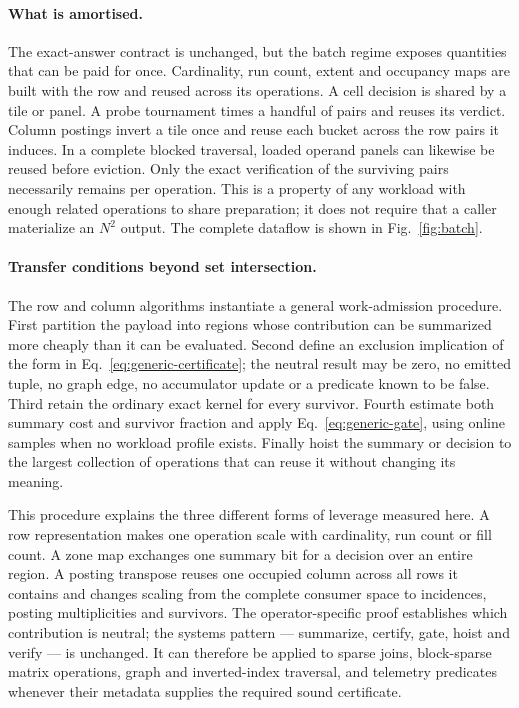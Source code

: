 \paragraph*{What is amortised.}
The exact-answer contract is unchanged, but the batch regime exposes quantities that can be paid for
once. Cardinality, run count, extent and occupancy maps are built with the row and reused across its
operations. A cell decision is shared by a tile or panel. A probe tournament times a handful of pairs
and reuses its verdict. Column postings invert a tile once and reuse each bucket across the row pairs
it induces. In a complete blocked traversal, loaded operand panels can likewise be reused before
eviction. Only the exact verification of the surviving pairs necessarily remains per operation. This
is a property of any workload with enough related operations to share preparation; it does not require
that a caller materialize an $N^2$ output. The complete dataflow is shown in Fig.~\ref{fig:batch}.

\paragraph*{Transfer conditions beyond set intersection.}
The row and column algorithms instantiate a general work-admission procedure. First partition the
payload into regions whose contribution can be summarized more cheaply than it can be evaluated.
Second define an exclusion implication of the form in Eq.~\eqref{eq:generic-certificate}; the neutral
result may be zero, no emitted tuple, no graph edge, no accumulator update or a predicate known to be
false. Third retain the ordinary exact kernel for every survivor. Fourth estimate both summary cost
and survivor fraction and apply Eq.~\eqref{eq:generic-gate}, using online samples when no workload
profile exists. Finally hoist the summary or decision to the largest collection of operations that
can reuse it without changing its meaning.

This procedure explains the three different forms of leverage measured here. A row representation
makes one operation scale with cardinality, run count or fill count. A zone map exchanges one summary
bit for a decision over an entire region. A posting transpose reuses one occupied column across all
rows it contains and changes scaling from the complete consumer space to incidences, posting
multiplicities and survivors. The operator-specific proof establishes which contribution is neutral;
the systems pattern --- summarize, certify, gate, hoist and verify --- is unchanged. It can therefore
be applied to sparse joins, block-sparse matrix operations, graph and inverted-index traversal, and
telemetry predicates whenever their metadata supplies the required sound certificate.


